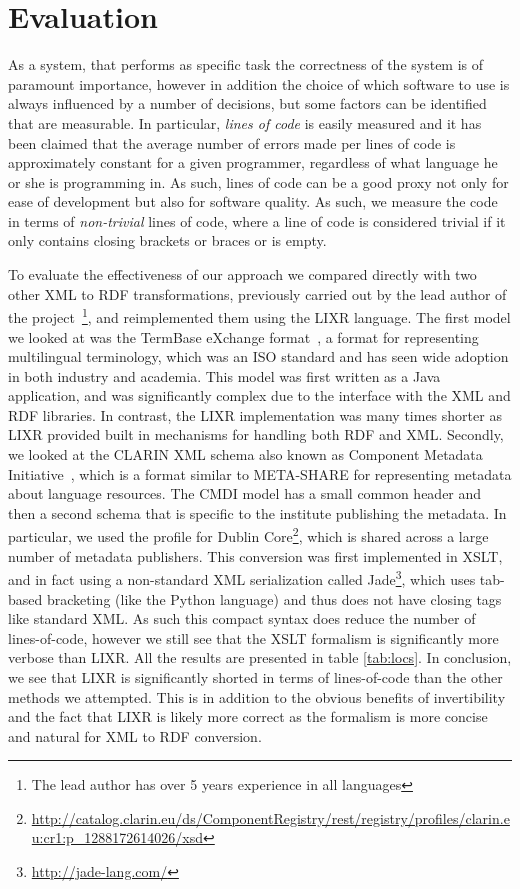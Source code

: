 \documentclass{acm_proc_article-sp}
\begin{document}
\section{Evaluation}
\label{sec:results}


As a system, that performs as specific task the correctness of the system is of 
paramount importance, however in addition the choice of which software to use
is always influenced by a number of decisions, but some factors can be identified
that are measurable. In particular, \emph{lines of code} is easily measured and it
has been claimed that the average number of errors made per lines of code is 
approximately constant for a given programmer, regardless of what language he or
she is programming in. As such, lines of code can be a good proxy not only for
ease of development but also for software quality. As such, we measure the
code in terms of \emph{non-trivial} lines of code, where a line of code
is considered trivial if it only contains closing brackets or braces or is empty.

To evaluate the effectiveness of our approach we compared directly with two other
XML to RDF transformations, previously carried out by the lead author of the
project~\footnote{The lead author has over 5 years experience in all languages}, and
reimplemented them using the LIXR language. The first model we looked at was the
TermBase eXchange format~\cite[TBX]{iso30042}, a format for representing multilingual
terminology, which was an ISO standard and has seen wide adoption in both industry
and academia. This model was first written as a Java application, and was significantly
complex due to the interface with the XML and RDF libraries. In contrast, the LIXR 
implementation was many times shorter as LIXR provided built in mechanisms for 
handling both RDF and XML. Secondly, we looked at the CLARIN XML schema also known as
Component Metadata Initiative~\cite{broeder2012cmdi}, which is a format similar
to META-SHARE for representing metadata about language resources. The CMDI model
has a small common header and then a second schema that is specific to the
institute publishing the metadata. In particular, we used the profile for 
Dublin Core\footnote{\url{http://catalog.clarin.eu/ds/ComponentRegistry/rest/registry/profiles/clarin.eu:cr1:p\_1288172614026/xsd}},
which is shared across a large number of metadata publishers. This conversion
was first implemented in XSLT, and in fact using a non-standard XML serialization
called Jade\footnote{\url{http://jade-lang.com/}}, which uses tab-based bracketing 
(like the Python language) and thus does not have closing tags like standard XML.
As such this compact syntax does reduce the number of lines-of-code, however we 
still see that the XSLT formalism is significantly more verbose than LIXR. All
the results are presented in table \ref{tab:locs}. In conclusion, we see that
LIXR is significantly shorted in terms of lines-of-code than the other methods
we attempted. This is in addition to the obvious benefits of invertibility and
the fact that LIXR is likely more correct as the formalism is more concise and 
natural for XML to RDF conversion. 
\end{document}
